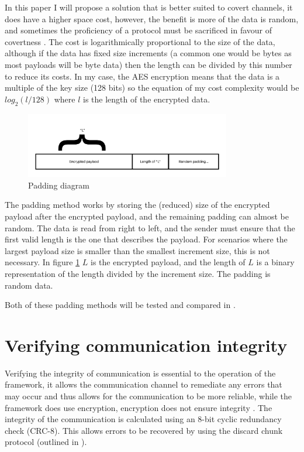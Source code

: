 In this paper I will propose a solution that is better suited to covert channels, it does have a higher space cost, however, the benefit is more of the data is random, and sometimes the proficiency of a protocol must be sacrificed in favour of covertness \citep{oCDCCEDNA}. The cost is logarithmically proportional to the size of the data, although if the data has fixed size increments (a common one would be bytes as most payloads will be byte data) then the length can be divided by this number to reduce its costs. In my case, the AES encryption means that the data is a multiple of the key size (128 bits) so the equation of my cost complexity would be $log_2(l/128)$ where $l$ is the length of the encrypted data.

\begin{figure}[h]
    \centering
    \includegraphics[width=0.8\textwidth]{fig/Padding_diagram.pdf}
    \caption{Padding diagram}
    \label{fig:padding_diagram}
\end{figure}

The padding method works by storing the (reduced) size of the encrypted payload after the encrypted payload, and the remaining padding can almost be random. The data is read from right to left, and the sender must ensure that the first valid length is the one that describes the payload. For scenarios where the largest payload size is smaller than the smallest increment size, this is not necessary. In figure \ref{fig:padding_diagram} $L$ is the encrypted payload, and the length of $L$ is a binary representation of the length divided by the increment size. The padding is random data.

Both of these padding methods will be tested and compared in .

\section{Verifying communication integrity}
\label{sec:integrity}

Verifying the integrity of communication is essential to the operation of the framework, it allows the communication channel to remediate any errors that may occur and thus allows for the communication to be more reliable, while the framework does use encryption, encryption does not ensure integrity \citep{GUCCA}. The integrity of the communication is calculated using an 8-bit cyclic redundancy check (CRC-8). This allows errors to be recovered by using the discard chunk protocol (outlined in ).

